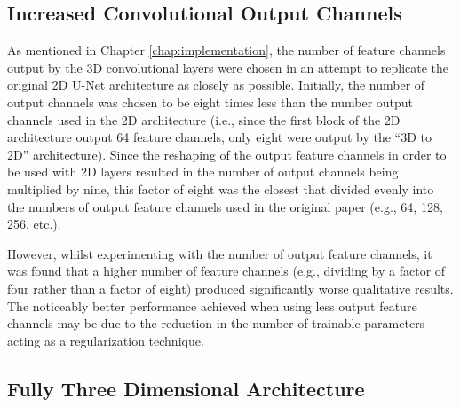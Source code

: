 \subsection{Increased Convolutional Output Channels}

As mentioned in Chapter \ref{chap:implementation}, the number of feature channels output by the 3D convolutional layers were chosen in an attempt to replicate the original 2D U-Net architecture as closely as possible. Initially, the number of output channels was chosen to be eight times less than the number output channels used in the 2D architecture (i.e., since the first block of the 2D architecture output 64 feature channels, only eight were output by the ``3D to 2D'' architecture). Since the reshaping of the output feature channels in order to be used with 2D layers resulted in the number of output channels being multiplied by nine, this factor of eight was the closest that divided evenly into the numbers of output feature channels used in the original paper (e.g., 64, 128, 256, etc.).

However, whilst experimenting with the number of output feature channels, it was found that a higher number of feature channels (e.g., dividing by a factor of four rather than a factor of eight) produced significantly worse qualitative results. The noticeably better performance achieved when using less output feature channels may be due to the reduction in the number of trainable parameters acting as a regularization technique.




\subsection{Fully Three Dimensional Architecture}

